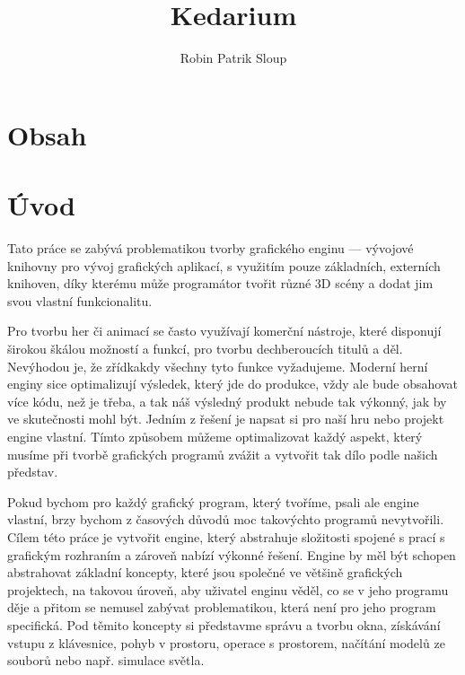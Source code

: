 \documentclass[12pt]{article}
\title{Kedarium}
\author{Robin Patrik Sloup}
\makeatletter
\renewcommand\tableofcontents{%
	\@starttoc{toc}%
}
\makeatother
\begin{document}




\section*{Obsah}
\tableofcontents
\pagebreak

\pagebreak

\section{Úvod}

Tato práce se zabývá problematikou tvorby grafického enginu — vývojové knihovny pro vývoj grafických aplikací, s využitím pouze základních, externích knihoven, díky kterému může programátor tvořit různé 3D scény a dodat jim svou vlastní funkcionalitu.

Pro tvorbu her či animací se často využívají komerční nástroje, které disponují širokou škálou možností a funkcí, pro tvorbu dechberoucích titulů a děl. Nevýhodou je, že zřídkakdy všechny tyto funkce vyžadujeme. Moderní herní enginy sice optimalizují výsledek, který jde do produkce, vždy ale bude obsahovat více kódu, než je třeba, a tak náš výsledný produkt nebude tak výkonný, jak by ve skutečnosti mohl být. Jedním z řešení je napsat si pro naší hru nebo projekt engine vlastní. Tímto způsobem můžeme optimalizovat každý aspekt, který musíme při tvorbě grafických programů zvážit a vytvořit tak dílo podle našich představ.

Pokud bychom pro každý grafický program, který tvoříme, psali ale engine vlastní, brzy bychom z časových důvodů moc takovýchto programů nevytvořili. Cílem této práce je vytvořit engine, který abstrahuje složitosti spojené s prací s grafickým rozhraním a zároveň nabízí výkonné řešení. Engine by měl být schopen abstrahovat základní koncepty, které jsou společné ve většině grafických projektech, na takovou úroveň, aby uživatel enginu věděl, co se v jeho programu děje a přitom se nemusel zabývat problematikou, která není pro jeho program specifická. Pod těmito koncepty si představme správu a tvorbu okna, získávání vstupu z klávesnice, pohyb v prostoru, operace s prostorem, načítání modelů ze souborů nebo např. simulace světla.
\end{document}
